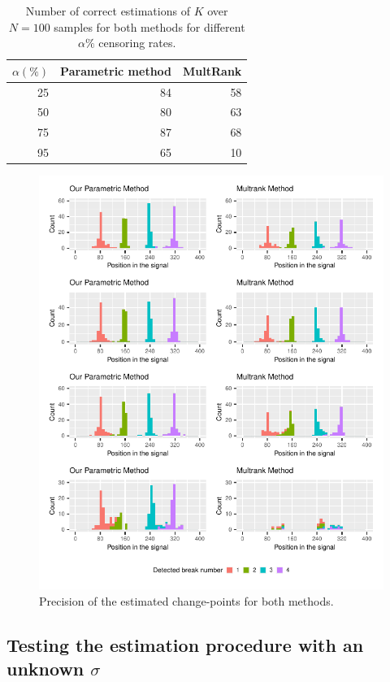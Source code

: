 \begin{table}[ht]
\centering
\begin{tabular}{|r|r|r|}
  \hline
   $\alpha(\%)$  & Parametric method & MultRank \\ 
  \hline
 25 &  84 &  58 \\ 
 50 &  80 &  63 \\ 
 75 &  87 &  68 \\ 
 95 &  65 &  10 \\ 
   \hline
\end{tabular}
\caption{Number of correct estimations of $K$ over $N=100$ samples for both methods for different $\alpha\%$ censoring rates.}
\label{tab:simcomp}
\end{table}

\begin{figure}[ht]
    \centering
    \includegraphics{figs/Chap4/detect_comp.pdf}
    \caption{Precision of the estimated change-points for both methods.}
    \label{fig:prec_sim}
\end{figure}


\subsection{Testing the estimation procedure with an unknown $\sigma$}\label{chp:4:4:3}

